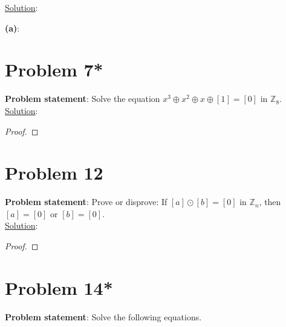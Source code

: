 \documentclass{article} %
\begin{document}
\underline{Solution}: 
\begin{addmargin}[1em]{0em}
\textbf{(a)}:
\begin{addmargin}[1em]{0em}
\end{addmargin}
\end{addmargin}

\newpage

\section*{Problem 7*}


\textbf{Problem statement}: Solve the equation $x^3 \oplus x^2 \oplus x \oplus [1] = [0]$ in $\mathbb{Z}_8$.
\\

\underline{Solution}: 
\begin{addmargin}[1em]{0em}
\begin{proof}

\end{proof}
\end{addmargin}

\newpage

\section*{Problem 12}


\textbf{Problem statement}: Prove or disprove: If $[a] \odot [b] = [0]$ in $\mathbb{Z}_n$, then $[a] = [0]$ or $[b] = [0]$.
\\

\underline{Solution}: 
\begin{addmargin}[1em]{0em}
\begin{proof}

\end{proof}
\end{addmargin}

\newpage

\section*{Problem 14*}


\textbf{Problem statement}: Solve the following equations.
\\
\end{document}
